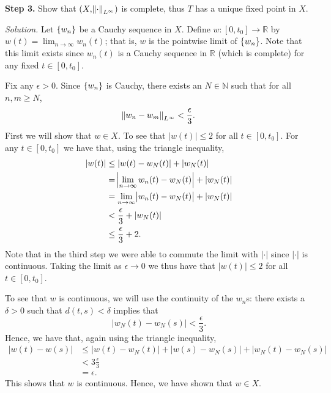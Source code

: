\documentclass{article}
\newcommand{\N}{\mathbb{N}}
\newcommand{\R}{\mathbb{R}}
\begin{document}
\newpage

\textbf{Step 3.}
Show that $(X, \norm{\cdot}_{L^\infty})$ is complete, thus $T$ has a
unique fixed point in $X$.

\textit{Solution.}
Let $\cbr{w_n}$ be a Cauchy sequence in $X$. Define $w: [0, t_0] \to \R$
by $w(t) = \lim_{n \to \infty} w_n(t)$; that is, $w$ is the pointwise
limit of $\cbr{w_n}$. Note that this limit exists since $w_n(t)$ is a
Cauchy sequence in $\R$ (which is complete) for any fixed $t \in [0,
t_0]$.

Fix any $\epsilon > 0$. Since $\cbr{w_n}$ is Cauchy, there exists an $N
\in \N$ such that for all $n, m \geq N$,
%
\begin{equation*}
    \norm{w_n - w_m}_{L^\infty} < \frac{\epsilon}{3}
    .
\end{equation*}
%
First we will show that $w \in X$. To see that $|w(t)| \leq 2$ for all
$t \in [0, t_0]$. For any $t \in [0, t_0]$ we have that, using the
triangle inequality,
%
\begin{align*}
    |w(t)| &\leq |w(t) - w_N(t)| + |w_N(t)| \\
           &= \envert[2]{\lim_{n \to \infty} w_n(t) - w_N(t)} + |w_N(t)| \\
           &= \lim_{n \to \infty} \envert{w_n(t) - w_N(t)} + |w_N(t)| \\
           &< \frac{\epsilon}{3} + |w_N(t)| \\
           &\leq \frac{\epsilon}{3} + 2
           .
\end{align*}
%
Note that in the third step we were able to commute the limit with
$|\cdot|$ since $|\cdot|$ is continuous. Taking the limit as $\epsilon
\to 0$ we thus have that $|w(t)| \leq 2$ for all $t \in [0, t_0]$.

To see that $w$ is continuous, we will use the continuity of the $w_n$s:
there exists a $\delta > 0$ such that $d(t, s) < \delta$ implies that
%
\begin{equation*}
    |w_N(t) - w_N(s)| < \frac{\epsilon}{3}
    .
\end{equation*}
%
Hence, we have that, again using the triangle inequality,
%
\begin{align*}
    |w(t) - w(s)| &\leq |w(t) - w_N(t)| + |w(s) - w_N(s)| + |w_N(t) - w_N(s)| \\
                  &< 3 \frac{\epsilon}{3} \\
                  &= \epsilon
                  .
\end{align*}
%
This shows that $w$ is continuous. Hence, we have shown that $w \in X$.
\end{document}
